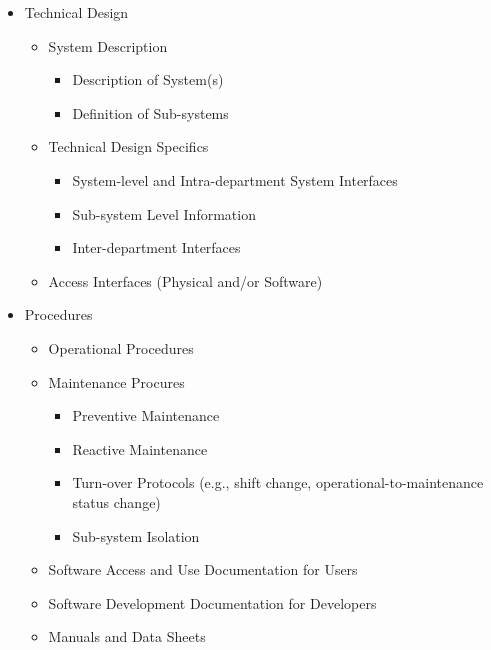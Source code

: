 \begin{small}

\begin{itemize}
  \item Technical Design
	\begin{itemize}

	  \item System Description
		\begin{itemize}
		  \item Description of System(s)
		  \item Definition of Sub-systems
		\end{itemize}

	  \item Technical Design Specifics
		\begin{itemize}
		  \item System-level and Intra-department System Interfaces
		  \item Sub-system Level Information
		  \item Inter-department Interfaces
		\end{itemize}
	  \item Access Interfaces (Physical and/or Software)
	\end{itemize}


  \item Procedures
	\begin{itemize}

	  \item Operational Procedures

	  \item Maintenance Procures
		\begin{itemize}
		  \item Preventive Maintenance
		  \item Reactive Maintenance
		  \item Turn-over Protocols (e.g., shift change, operational-to-maintenance status change)
		  \item Sub-system Isolation
		\end{itemize}

	  \item Software Access and Use Documentation for Users

	  \item Software Development Documentation for Developers

	  \item Manuals and Data Sheets
	\end{itemize}



\end{itemize}
\end{small}
